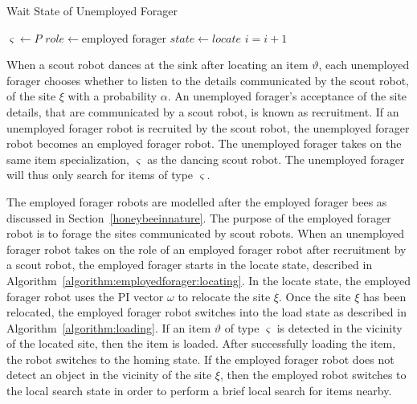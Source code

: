 \begin{algorithm}
\caption{Wait State of Unemployed Forager}
\label{algorithm:unemployedforager:locating}
\begin{algorithmic}[1]
	\State $\varsigma \gets P$
	\State {}
	\State $role \gets \text{employed forager}$
	\State $state \gets locate$
\EndIf
\State $i =i + 1$
\EndFunction
\end{algorithmic}
\end{algorithm}

When a scout robot dances at the sink after locating an item $\vartheta$, each unemployed forager chooses whether to listen to the details communicated by the scout robot, of the site $\xi$ with a probability $\alpha$. An unemployed forager's acceptance of the site details, that are communicated by a scout robot, is known as recruitment. If an unemployed forager robot is recruited by the scout robot, the unemployed forager robot becomes an employed forager robot. The unemployed forager takes on the same item specialization, $\varsigma$ as the dancing scout robot. The unemployed forager will thus only search for items of type $\varsigma$. 

The employed forager robots are modelled after the employed forager bees as discussed in Section~\ref{honeybeeinnature}. The purpose of the employed forager robot is to forage the sites communicated by scout robots. When an unemployed forager robot takes on the role of an employed forager robot after recruitment by a scout robot, the employed forager starts in the locate state, described in Algorithm~\ref{algorithm:employedforager:locating}. In the locate state, the employed forager robot uses the PI vector $\omega$ to relocate the site $\xi$. Once the site $\xi$ has been relocated, the employed forager robot switches into the load state as described in Algorithm~\ref{algorithm:loading}. If an item $\vartheta$ of type $\varsigma$ is detected in the vicinity of the located site, then the item is loaded. After successfully loading the item, the robot switches to the homing state. If the employed forager robot does not detect an object in the vicinity of the site $\xi$, then the employed robot switches to the local search state in order to perform a brief local search for items nearby. 


